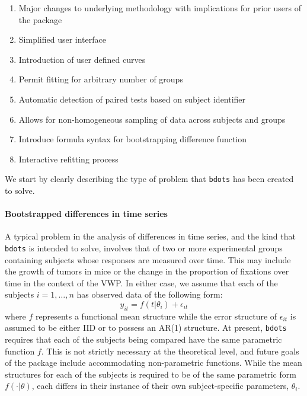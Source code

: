 \documentclass{article}
\newcommand{\xt}{\texttt}%
\begin{document}
\begin{singlespace}
\begin{enumerate}
\item Major changes to underlying methodology with implications for prior users of the package
\item Simplified user interface
\item Introduction of user defined curves
\item Permit fitting for arbitrary number of groups
\item Automatic detection of paired tests based on subject identifier
\item Allows for non-homogeneous sampling of data across subjects and groups
\item Introduce formula syntax for bootstrapping difference function
\item Interactive refitting process
\end{enumerate}
\end{singlespace}


We start by clearly describing the type of problem that \xt{bdots} has been created to solve.

\paragraph{Bootstrapped differences in time series}

A typical problem in the analysis of differences in time series, and the kind that \xt{bdots} is intended to solve, involves that of two or more experimental groups containing subjects whose responses are measured over time. This may include the growth of tumors in  mice or the change in the proportion of fixations over time in the context of the VWP. In either case, we assume that each of the subjects $i = 1, \dots, n$  has observed data of the following form:
\begin{equation}\label{eq:mean_structure1}
y_{it} = f(t | \theta_i) + \epsilon_{it} 
\end{equation}
where $f$ represents a functional mean structure while the error structure of $\epsilon_{it}$ is assumed to be either IID or to possess an AR(1) structure. At present, \xt{bdots} requires that each of the subjects being compared have the same parametric function $f$. This is not strictly necessary at the theoretical level, and future goals of the package include accommodating non-parametric functions. While the mean structures for each of the subjects is required to be of the same parametric form $f(\cdot | \theta)$, each differs in their instance of their own subject-specific parameters, $\theta_i$.
\end{document}
